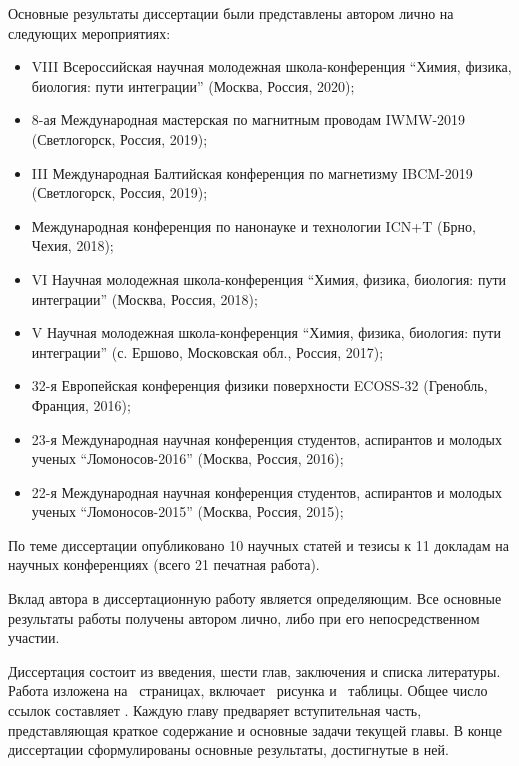 Основные результаты диссертации были представлены автором лично на следующих мероприятиях:
\begin{itemize}[nosep]
	\item VIII Всероссийская научная молодежная школа-конференция ``Химия, физика, биология: пути интеграции'' (Москва, Россия, 2020);
	\item 8-ая Международная мастерская по магнитным проводам IWMW-2019 (Светлогорск, Россия, 2019);
	\item III Международная Балтийская конференция по магнетизму IBCM-2019 (Светлогорск, Россия, 2019);
	\item Международная конференция по нанонауке и технологии ICN+T (Брно, Чехия, 2018);
	\item VI Научная молодежная школа-конференция ``Химия, физика, биология: пути интеграции'' (Москва, Россия, 2018);
	\item V Научная молодежная школа-конференция ``Химия, физика, биология: пути интеграции'' (с. Ершово, Московская обл., Россия, 2017);
	\item 32-я Европейская конференция физики поверхности ECOSS-32 (Гренобль, Франция, 2016);
	\item 23-я Международная научная конференция студентов, аспирантов и молодых ученых ``Ломоносов-2016'' (Москва, Россия, 2016);
	\item 22-я Международная научная конференция студентов, аспирантов и молодых ученых ``Ломоносов-2015'' (Москва, Россия, 2015);
\end{itemize}

По теме диссертации опубликовано 10 научных статей и тезисы к 11 докладам на научных конференциях (всего 21 печатная работа).

Вклад автора в диссертационную работу является определяющим. Все основные результаты работы получены автором лично, либо при его непосредственном участии.

Диссертация состоит из введения, шести глав, заключения и списка литературы.
Работа изложена на ~страницах, включает \totalfigures~рисунка и \totaltables~таблицы. Общее число ссылок составляет .
Каждую главу предваряет вступительная часть, представляющая краткое содержание и основные задачи текущей главы.
В конце диссертации сформулированы основные результаты, достигнутые в ней.
